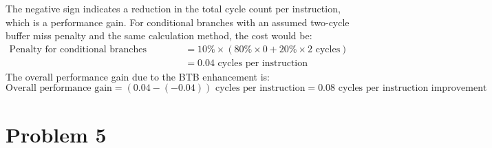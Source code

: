 \documentclass{article}
\begin{document}
The negative sign indicates a reduction in the total cycle count per instruction, which is a performance gain. For conditional branches with an assumed two-cycle buffer miss penalty and the same calculation method, the cost would be:
\[
\begin{aligned}
    \text{Penalty for conditional branches storing target address} &= 10\% \times (80\% \times 0 + 20\% \times 2 \text{ cycles})\\
    &= 0.04 \text{ cycles per instruction}
\end{aligned}
\]
The overall performance gain due to the BTB enhancement is:
\begin{equation*}
    \text{Overall performance gain} = (0.04 - (-0.04)) \text{ cycles per instruction}= 0.08 \text{ cycles per instruction improvement}
\end{equation*}

\newpage
\section{Problem 5}
\end{document}

